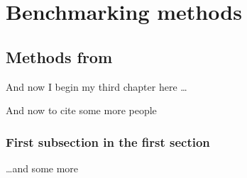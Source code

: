 \chapter{Benchmarking methods}

\ifpdf
    \graphicspath{{Chapter3/Figs/Raster/}{Chapter3/Figs/PDF/}{Chapter3/Figs/}}
\else
    \graphicspath{{Chapter3/Figs/Vector/}{Chapter3/Figs/}}
\fi

\section{Methods from }
And now I begin my third chapter here \dots

And now to cite some more people~\citet{Rea85,Ancey1996}

\subsection{First subsection in the first section}
\dots and some more 


